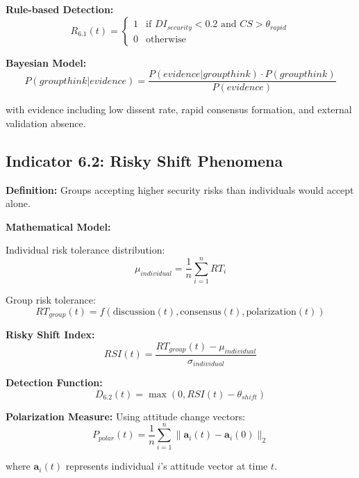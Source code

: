 \documentclass[11pt,a4paper]{article}
\begin{document}
\textbf{Rule-based Detection:}
\begin{equation}
R_{6.1}(t) = \begin{cases}
1 & \text{if } DI_{security} < 0.2 \text{ and } CS > \theta_{rapid} \\
0 & \text{otherwise}
\end{cases}
\end{equation}

\textbf{Bayesian Model:}
\begin{equation}
P(groupthink|evidence) = \frac{P(evidence|groupthink) \cdot P(groupthink)}{P(evidence)}
\end{equation}

with evidence including low dissent rate, rapid consensus formation, and external validation absence.

\subsection{Indicator 6.2: Risky Shift Phenomena}

\textbf{Definition:} Groups accepting higher security risks than individuals would accept alone.

\textbf{Mathematical Model:}

Individual risk tolerance distribution:
\begin{equation}
\mu_{individual} = \frac{1}{n}\sum_{i=1}^n RT_i
\end{equation}

Group risk tolerance:
\begin{equation}
RT_{group}(t) = f(\text{discussion}(t), \text{consensus}(t), \text{polarization}(t))
\end{equation}

\textbf{Risky Shift Index:}
\begin{equation}
RSI(t) = \frac{RT_{group}(t) - \mu_{individual}}{\sigma_{individual}}
\end{equation}

\textbf{Detection Function:}
\begin{equation}
D_{6.2}(t) = \max(0, RSI(t) - \theta_{shift})
\end{equation}

\textbf{Polarization Measure:}
Using attitude change vectors:
\begin{equation}
P_{polar}(t) = \frac{1}{n}\sum_{i=1}^n \|\mathbf{a}_i(t) - \mathbf{a}_i(0)\|_2
\end{equation}

where $\mathbf{a}_i(t)$ represents individual $i$'s attitude vector at time $t$.
\end{document}
